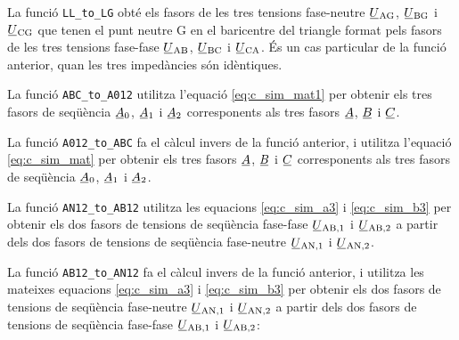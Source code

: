 


La funció \texttt{LL\_to\_LG} obté els fasors de les tres tensions fase-neutre $\cmplx{U}\ped{AG}$, $\cmplx{U}\ped{BG}$ i $\cmplx{U}\ped{CG}$ que tenen el punt neutre G en el baricentre del triangle format pels fasors de  les tres tensions fase-fase
$\cmplx{U}\ped{AB}$, $\cmplx{U}\ped{BC}$ i $\cmplx{U}\ped{CA}$. És un cas particular de la funció anterior, quan les tres impedàncies són idèntiques.




La funció \texttt{ABC\_to\_A012} utilitza l'equació \eqref{eq:c_sim_mat1} per obtenir els tres fasors de seqüència
$\cmplx{A}_0$, $\cmplx{A}_1$ i  $\cmplx{A}_2$ corresponents als tres fasors $\cmplx{A}$, $\cmplx{B}$ i $\cmplx{C}$.




La funció \texttt{A012\_to\_ABC} fa el càlcul  invers de la funció anterior, i utilitza l'equació \eqref{eq:c_sim_mat} per obtenir els tres fasors
$\cmplx{A}$, $\cmplx{B}$ i $\cmplx{C}$  corresponents als tres fasors de seqüència
$\cmplx{A}_0$, $\cmplx{A}_1$ i  $\cmplx{A}_2$.




La funció \texttt{AN12\_to\_AB12} utilitza les equacions  \eqref{eq:c_sim_a3} i \eqref{eq:c_sim_b3} per obtenir els dos fasors de tensions de seqüència fase-fase $\cmplx{U}\ped{AB,1}$ i  $\cmplx{U}\ped{AB,2}$ a partir dels dos fasors de tensions de seqüència fase-neutre $\cmplx{U}\ped{AN,1}$ i $\cmplx{U}\ped{AN,2}$.




La funció \texttt{AB12\_to\_AN12} fa el càlcul invers de la funció anterior, i utilitza les mateixes equacions  \eqref{eq:c_sim_a3} i \eqref{eq:c_sim_b3} per obtenir els dos fasors de tensions de seqüència fase-neutre $\cmplx{U}\ped{AN,1}$ i $\cmplx{U}\ped{AN,2}$ a partir dels dos fasors de tensions de seqüència fase-fase $\cmplx{U}\ped{AB,1}$ i  $\cmplx{U}\ped{AB,2}$:

